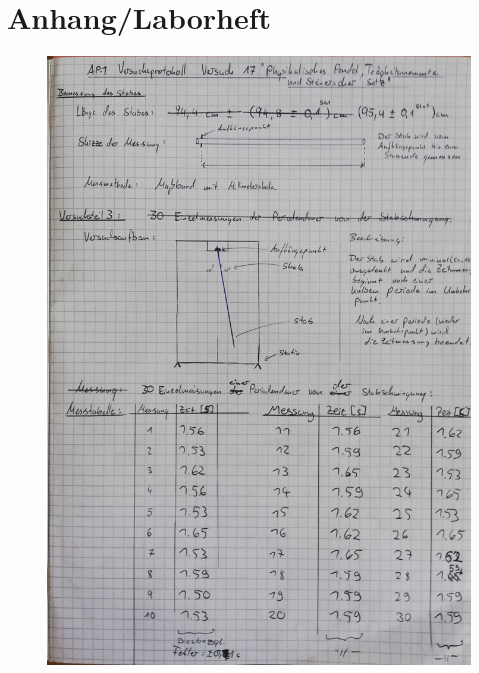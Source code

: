 \documentclass[11pt,a4paper]{article}
\begin{document}
\section{Anhang/Laborheft}
\begin{figure}[H]
	\includegraphics[width=1\linewidth]{S1.jpg}
	\centering
\end{figure}
\end{document}
